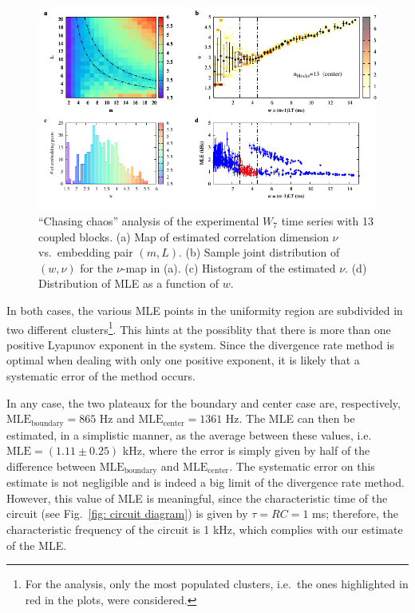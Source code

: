 \begin{figure}[ht!]
    \centering
    \includegraphics[width=\linewidth]{../blocks/13_blocks/middle/2e5_points/plots/chaos_low.pdf}
    \caption{``Chasing chaos'' analysis of the experimental $W_7$ time series with 13 coupled blocks.
    (a) Map of estimated correlation dimension $\nu$ vs.\ embedding pair $(m, L)$.
    (b) Sample joint distribution of $(w,\nu)$ for the $\nu$-map in (a).
    (c) Histogram of the estimated $\nu$. (d) Distribution of MLE as a function of $w$.
    }\label{fig: 13 blocks chaos center}
\end{figure}

In both cases, the various MLE points in the uniformity region are subdivided in two different clusters\footnote{
For the analysis, only the most populated clusters, i.e.\ the ones highlighted in red in the plots,
were considered.}.
This hints at the possiblity that there is more than one positive Lyapunov exponent in the system.
Since the divergence rate method is optimal when dealing with only one positive exponent,
it is likely that a systematic error of the method occurs.

In any case, the two plateaux for the boundary and center case are, respectively,
$\text{MLE}_\text{boundary}=865$ Hz and $\text{MLE}_\text{center}=1361$ Hz.
The MLE can then be estimated, in a simplistic manner, as the average between
these values, i.e.\ $\text{MLE}=(1.11\pm0.25)$ kHz, where the error is simply given by half of the difference
between $\text{MLE}_\text{boundary}$ and $\text{MLE}_\text{center}$.
The systematic error on this estimate
is not negligible and is indeed a big limit of the divergence rate method.
However, this value of MLE is meaningful, since the characteristic time of the circuit
(see Fig.~\ref{fig: circuit diagram}) is given by $\tau=RC=1$ ms; therefore, the characteristic
frequency of the circuit is 1 kHz, which complies with our estimate of the MLE\@.






